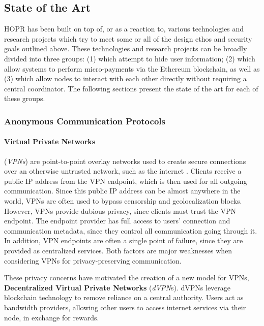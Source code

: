 \subsection{State of the Art}
\label{sec:intro:stateoftheart}

HOPR has been built on top of, or as a reaction to, various technologies and research projects which try to meet some or all of the design ethos and security goals outlined above. These technologies and research projects can be broadly divided into three groups: (1)  which attempt to hide user information; (2)  which allow systems to perform micro-payments via the Ethereum blockchain, as well as (3)  which allow nodes to interact with each other directly without requiring a central coordinator. The following sections present the state of the art for each of these groups.

\subsubsection{Anonymous Communication Protocols}
\label{sec:intro:stateoftheart:privacyprotocols}

\paragraph{Virtual Private Networks}(\textit{VPNs}) are point-to-point overlay networks used to create secure connections over an otherwise untrusted network, such as the internet \cite{venkateswaran_2001}. Clients receive a public IP address from the VPN endpoint, which is then used for all outgoing communication. Since this public IP address can be almost anywhere in the world, VPNs are often used to bypass censorship \cite{hobbs_roberts_2018} and geolocalization blocks. However, VPNs provide dubious privacy, since clients must trust the VPN endpoint. The endpoint provider has full access to users' connection and communication metadata, since they control all communication going through it. In addition, VPN endpoints are often a single point of failure, since they are provided as centralized services. Both factors are major weaknesses when considering VPNs for privacy-preserving communication.

These privacy concerns have motivated the creation of a new model for VPNs, \textbf{Decentralized Virtual Private Networks} (\textit{dVPN}s). dVPNs leverage blockchain technology to remove reliance on a central authority. Users act as bandwidth providers, allowing other users to access internet services via their node, in exchange for rewards.

